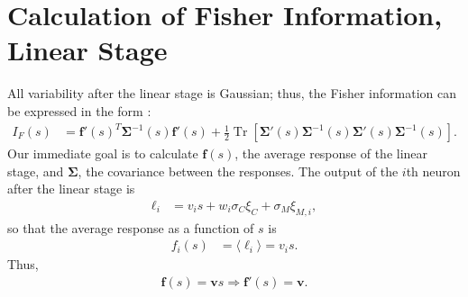 \documentclass[11pt]{article}
\DeclareMathOperator{\Tr}{Tr}
\begin{document}
	\begin{figure}[t]
		\centering
		\caption{} 
		\label{fig:struct-linear}
	\end{figure}	
	\newpage
	\printbibliography

	\newpage
	
	\appendix
	\section{Calculation of  Fisher Information, Linear Stage}
	\label{fisher-linear}
	All variability after the linear stage is Gaussian; thus, the Fisher information can be expressed in the form \cite{1999abbott_dayan, 1993kay}:
	\begin{align}
		I_{F}(s) &= \mathbf{f}'(s)^T \boldsymbol{\Sigma}^{-1} (s) \mathbf{f}'(s) + \frac{1}{2}\Tr\left[\boldsymbol{\Sigma}'(s) \boldsymbol{\Sigma}^{-1}(s)\boldsymbol{\Sigma}'(s) \boldsymbol{\Sigma}^{-1}(s)\right]. \label{IF-gaussian}
	\end{align}
	Our immediate goal is to calculate $\mathbf{f}(s)$, the average response of the linear stage, and $\boldsymbol{\Sigma}$, the covariance between the responses. The output of the $i$th neuron after the linear stage is
	\begin{align}
		\ell_i &= v_i s + w_i \sigma_C \xi_C + \sigma_M\xi_{M,i},
	\end{align}
	so that the average response as a function of $s$ is
	\begin{align}
		f_i(s) &= \langle \ell_i \rangle = v_i s.
	\end{align}
	Thus,
	\begin{align}
		\mathbf{f}(s) = \mathbf{v}s \Rightarrow \mathbf{f}'(s) = \mathbf{v}.
	\end{align}
	
\end{document}
